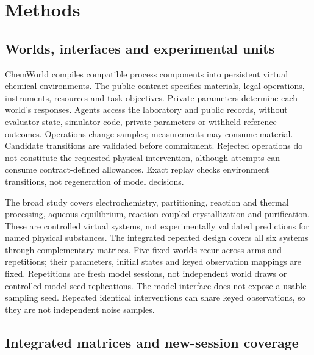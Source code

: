 \documentclass[10pt,a4paper]{article}
\begin{document}
\clearpage

\section{Methods}\label{methods}

\subsection{Worlds, interfaces and experimental units}\label{worlds-interfaces-and-experimental-units}

ChemWorld compiles compatible process components into persistent virtual chemical environments. The public contract specifies materials, legal operations, instruments, resources and task objectives. Private parameters determine each world's responses. Agents access the laboratory and public records, without evaluator state, simulator code, private parameters or withheld reference outcomes. Operations change samples; measurements may consume material. Candidate transitions are validated before commitment. Rejected operations do not constitute the requested physical intervention, although attempts can consume contract-defined allowances. Exact replay checks environment transitions, not regeneration of model decisions.

The broad study covers electrochemistry, partitioning, reaction and thermal processing, aqueous equilibrium, reaction-coupled crystallization and purification. These are controlled virtual systems, not experimentally validated predictions for named physical substances. The integrated repeated design covers all six systems through complementary matrices. Five fixed worlds recur across arms and repetitions; their parameters, initial states and keyed observation mappings are fixed. Repetitions are fresh model sessions, not independent world draws or controlled model-seed replications. The model interface does not expose a usable sampling seed. Repeated identical interventions can share keyed observations, so they are not independent noise samples.

\subsection{Integrated matrices and new-session coverage}\label{integrated-matrices-and-new-session-coverage}
\end{document}
